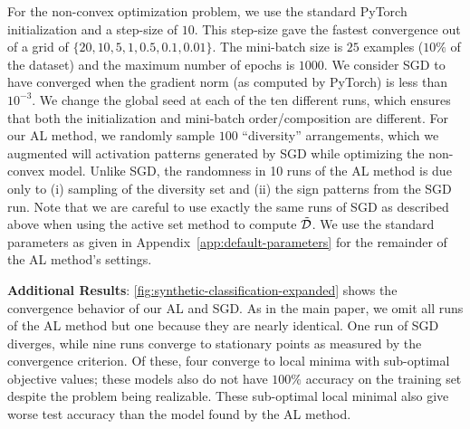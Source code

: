 For the non-convex optimization problem, we use the standard PyTorch initialization and a step-size of \( 10 \).
This step-size gave the fastest convergence out of a grid of \( \{20, 10, 5, 1, 0.5, 0.1, 0.01\} \).
The mini-batch size is \( 25 \) examples (\( 10 \% \) of the dataset) and the maximum number of epochs is \( 1000 \).
We consider SGD to have converged when the gradient norm (as computed by PyTorch) is less than \( 10^{-3} \).
We change the global seed at each of the ten different runs, which ensures that both the initialization and mini-batch order/composition are different.
For our AL method, we randomly sample \( 100 \) ``diversity'' arrangements, which we augmented will activation patterns generated by SGD while optimizing the non-convex model.
Unlike SGD, the randomness in 10 runs of the AL method is due only to (i) sampling of the diversity set and (ii) the sign patterns from the SGD run.
Note that we are careful to use exactly the same runs of SGD as described above when using the active set method to compute \( \tilde {\mathcal{D}} \).
We use the standard parameters as given in Appendix~\ref{app:default-parameters} for the remainder of the AL method's settings.

\textbf{Additional Results}:
\cref{fig:synthetic-classification-expanded} shows the convergence behavior of our AL and SGD.\@
As in the main paper, we omit all runs of the AL method but one because they are nearly identical.
One run of SGD diverges, while nine runs converge to stationary points as measured by the convergence criterion.
Of these, four converge to local minima with sub-optimal objective values; these models also do not have \( 100 \% \) accuracy on the training set despite the problem being realizable.
These sub-optimal local minimal also give worse test accuracy than the model found by the AL method.
